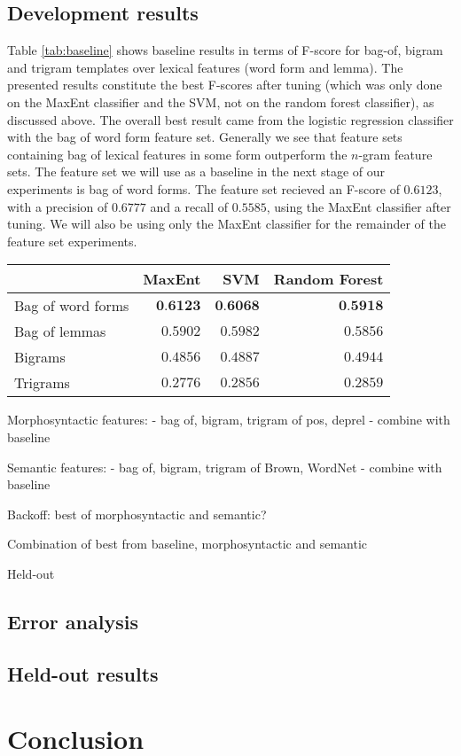 \documentclass[11pt,letterpaper]{article}
\begin{document}
\subsection{Development results}
Table \ref{tab:baseline} shows baseline results in terms of F-score
for bag-of, bigram and trigram templates over lexical features (word
form and lemma). The presented results constitute the best F-scores
after tuning (which was only done on the MaxEnt classifier and the
SVM, not on the random forest classifier), as discussed above. The
overall best result came from the logistic regression classifier with
the bag of word form feature set. Generally we see that feature sets
containing bag of lexical features in some form outperform the
$n$-gram feature sets.
The feature set we will use as a baseline in the next stage of our
experiments is bag of word forms. The feature set recieved an F-score
of $0.6123$, with a precision of $0.6777$ and a recall of $0.5585$,
using the MaxEnt classifier after tuning. We will also be
using only the MaxEnt classifier for the remainder of the
feature set experiments.
\begin{table*}
  \begin{center}
    \begin{tabular}{lrrr}
      \toprule

      & MaxEnt & SVM & Random Forest \\
      \midrule
      Bag of word forms & $\textbf{0.6123}$ & $\textbf{0.6068}$ & $\textbf{0.5918}$ \\ %
      Bag of lemmas & $0.5902$ & $0.5982$ & $0.5856$ \\
      Bigrams & $0.4856$ & $0.4887$ & $0.4944$ \\
      Trigrams & $0.2776$ & $0.2856$ & $0.2859$ \\
      
      
      \bottomrule
    \end{tabular}
  \end{center}
  \caption{Results for baseline system; F-score for bag-of, bigram and trigram templates over lexical features (word form and lemma).}
  \label{tab:baseline}
\end{table*}

Morphosyntactic features:
- bag of, bigram, trigram of pos, deprel
- combine with baseline

Semantic features:
- bag of, bigram, trigram of Brown, WordNet
- combine with baseline

Backoff: best of morphosyntactic and semantic?

Combination of best from baseline, morphosyntactic and semantic

Held-out

\subsection{Error analysis}

\subsection{Held-out results}

\section{Conclusion}
\label{sec:disc}



\end{document}
